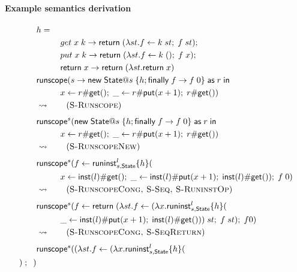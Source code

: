 {\paragraph{Example semantics derivation}
\begin{align*}
& \handler = \\
	&\hspace{1cm} \hop{get}{x}{k}{\creturn{(\vabs{st}{\cdo{f}{\capp{k}{st}}{\capp{f}{st}}})}}{\\
	&\hspace{1cm} \hop{put}{x}{k}{\creturn{(\vabs{st}{\cdo{f}{\capp{k}{()}}{\capp{f}{x}}})}}{\\
	&\hspace{1cm} \hreturn{x}{\creturn{(\vabs{st}{\creturn{x}})}}}} \\
&\chandlen{s}{\cnew{\mathsf{State}}{s}{\handler ; \hfinally{f}{\capp{f}{0}}}{r}{\\
	&\hspace{1cm} \cdo{x}{\cop{r}{\mathsf{get}}{}}{\cdo{\_}{\cop{r}{\mathsf{put}}{x + 1}}{\cop{r}{\mathsf{get}}{}}}}} \\
& \opsem{} \tag{\textsc{S-Runscope}} \\
& \chandlec{s}{\cnew{\mathsf{State}}{s}{\handler ; \hfinally{f}{\capp{f}{0}}}{r}{\\
	&\hspace{1cm} \cdo{x}{\cop{r}{\mathsf{get}}{}}{\cdo{\_}{\cop{r}{\mathsf{put}}{x + 1}}{\cop{r}{\mathsf{get}}{}}}}} \\
& \opsem{} \tag{\textsc{S-RunscopeNew}} \\
& \chandlec{s}{\cdo{f}{\chandlei{l}{s,\mathsf{State}}{h}{\\
	&\hspace{1cm} \cdo{x}{\cop{\vinst{l}}{\mathsf{get}}{}}{\cdo{\_}{\cop{\vinst{l}}{\mathsf{put}}{x + 1}}{\cop{\vinst{l}}{\mathsf{get}}{}}}}}{\capp{f}{0}}} \\
& \opsem{} \tag{\textsc{S-RunscopeCong, S-Seq, S-RuninstOp}} \\
& \chandlec{s}{\cdo{f}{\creturn{(\vabs{st}{\cdo{f}{\capp{(\vabs{x}{\chandlei{l}{s,\mathsf{State}}{h}{\\
	&\hspace{1cm} \cdo{\_}{\cop{\vinst{l}}{\mathsf{put}}{x + 1}}{\cop{\vinst{l}}{\mathsf{get}}{}}}})}{st}}{\capp{f}{st}}})}}{f 0}} \\
& \opsem{} \tag{\textsc{S-RunscopeCong, S-SeqReturn}} \\
& \chandlec{s}{\capp{(\vabs{st}{\cdo{f}{\capp{(\vabs{x}{\chandlei{l}{s,\mathsf{State}}{h}{\\
}}}}}}}
\end{align*}}
